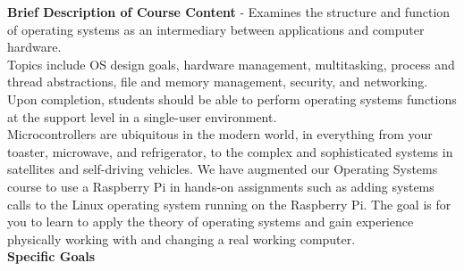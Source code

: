 \documentclass{article}
\begin{document}
\noindent \textbf{Brief Description of Course Content} - Examines the structure and function of operating systems as an intermediary between applications and computer hardware. \\

\noindent Topics include OS design goals, hardware management, multitasking, process and thread abstractions, file and memory management, security, and networking. Upon completion, students should be able to perform operating systems functions at the support level in a single-user environment. \\

\noindent Microcontrollers are ubiquitous in the modern world, in everything from your toaster, microwave, and refrigerator, to the complex and sophisticated systems in satellites and self-driving vehicles.  We have augmented our Operating Systems course to use a Raspberry Pi in hands-on assignments such as adding systems calls to the Linux operating system running on the Raspberry Pi.  The goal is for you to learn to apply the theory of operating systems and gain experience physically working with and changing a real working computer. \\

\noindent \textbf{Specific Goals} \\
\end{document}
